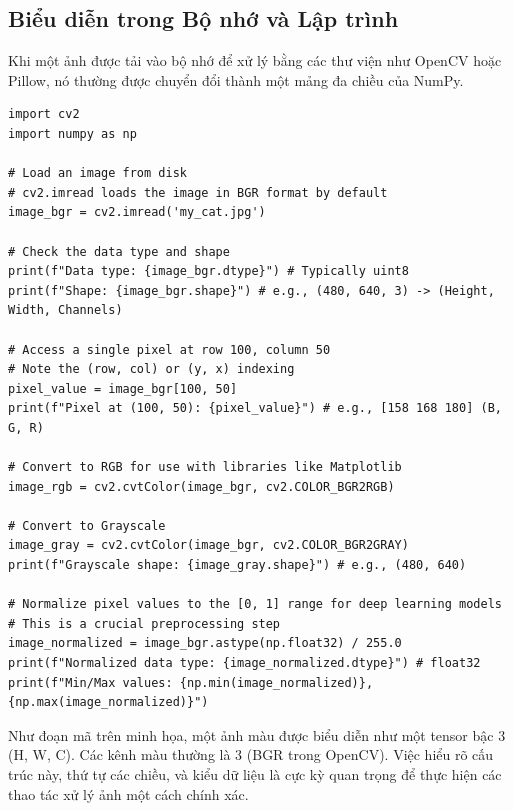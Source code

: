 \subsection{Biểu diễn trong Bộ nhớ và Lập trình}
\label{subsec:memory_representation}
Khi một ảnh được tải vào bộ nhớ để xử lý bằng các thư viện như OpenCV hoặc Pillow, nó thường được chuyển đổi thành một mảng đa chiều của NumPy.
\begin{verbatim}
import cv2
import numpy as np

# Load an image from disk
# cv2.imread loads the image in BGR format by default
image_bgr = cv2.imread('my_cat.jpg')

# Check the data type and shape
print(f"Data type: {image_bgr.dtype}") # Typically uint8
print(f"Shape: {image_bgr.shape}") # e.g., (480, 640, 3) -> (Height, Width, Channels)

# Access a single pixel at row 100, column 50
# Note the (row, col) or (y, x) indexing
pixel_value = image_bgr[100, 50]
print(f"Pixel at (100, 50): {pixel_value}") # e.g., [158 168 180] (B, G, R)

# Convert to RGB for use with libraries like Matplotlib
image_rgb = cv2.cvtColor(image_bgr, cv2.COLOR_BGR2RGB)

# Convert to Grayscale
image_gray = cv2.cvtColor(image_bgr, cv2.COLOR_BGR2GRAY)
print(f"Grayscale shape: {image_gray.shape}") # e.g., (480, 640)

# Normalize pixel values to the [0, 1] range for deep learning models
# This is a crucial preprocessing step
image_normalized = image_bgr.astype(np.float32) / 255.0
print(f"Normalized data type: {image_normalized.dtype}") # float32
print(f"Min/Max values: {np.min(image_normalized)}, {np.max(image_normalized)}")
\end{verbatim}
Như đoạn mã trên minh họa, một ảnh màu được biểu diễn như một tensor bậc 3 (H, W, C). Các kênh màu thường là 3 (BGR trong OpenCV). Việc hiểu rõ cấu trúc này, thứ tự các chiều, và kiểu dữ liệu là cực kỳ quan trọng để thực hiện các thao tác xử lý ảnh một cách chính xác.

